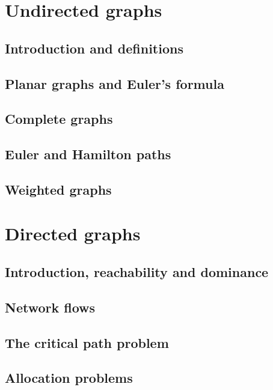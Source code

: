 \documentclass[a4paper,11pt]{article}
\begin{document}
\newpage

\section{Undirected graphs}
\begin{outline}

\0
\subsection{Introduction and definitions}

\0
\subsection{Planar graphs and Euler's formula}

\0
\subsection{Complete graphs}

\0
\subsection{Euler and Hamilton paths}

\0
\subsection{Weighted graphs}

\end{outline}

\newpage

\section{Directed graphs}
\begin{outline}

\0
\subsection{Introduction, reachability and dominance}

\0
\subsection{Network flows}

\0
\subsection{The critical path problem}

\0
\subsection{Allocation problems}

\end{outline}
\end{document}
